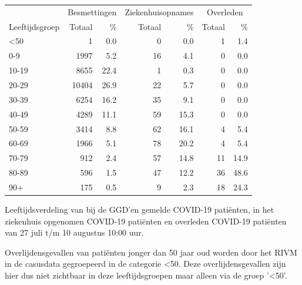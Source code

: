 \documentclass[
  english,
  man,floatsintext]{apa6}
\begin{document}
\begin{table}
\centering\begingroup\fontsize{11}{13}\selectfont

\begin{threeparttable}
\begin{tabular}{lrrrrrr}
\toprule
\multicolumn{1}{c}{ } & \multicolumn{2}{c}{Besmettingen} & \multicolumn{2}{c}{Ziekenhuisopnames} & \multicolumn{2}{c}{Overleden} \\
\cmidrule(l{3pt}r{3pt}){2-3} \cmidrule(l{3pt}r{3pt}){4-5} \cmidrule(l{3pt}r{3pt}){6-7}
Leeftijdsgroep & Totaal & \% & Totaal & \% & Totaal & \%\\
\midrule
<50 & 1 & 0.0 & 0 & 0.0 & 1 & 1.4\\
0-9 & 1997 & 5.2 & 16 & 4.1 & 0 & 0.0\\
10-19 & 8655 & 22.4 & 1 & 0.3 & 0 & 0.0\\
20-29 & 10404 & 26.9 & 22 & 5.7 & 0 & 0.0\\
30-39 & 6254 & 16.2 & 35 & 9.1 & 0 & 0.0\\
40-49 & 4289 & 11.1 & 59 & 15.3 & 0 & 0.0\\
50-59 & 3414 & 8.8 & 62 & 16.1 & 4 & 5.4\\
60-69 & 1966 & 5.1 & 78 & 20.2 & 4 & 5.4\\
70-79 & 912 & 2.4 & 57 & 14.8 & 11 & 14.9\\
80-89 & 596 & 1.5 & 47 & 12.2 & 36 & 48.6\\
90+ & 175 & 0.5 & 9 & 2.3 & 18 & 24.3\\
\bottomrule
\end{tabular}
\begin{tablenotes}
\item[1] Leeftijdsverdeling van bij de GGD’en gemelde COVID-19 patiënten, in het ziekenhuis opgenomen COVID-19 patiënten en overleden COVID-19 patiënten van 27 juli t/m 10 augustus 10:00 uur.
\item[2] Overlijdensgevallen van patiënten jonger dan 50 jaar oud worden door het RIVM in de casusdata gegroepeerd in de categorie <50. Deze overlijdensgevallen zijn hier dus niet zichtbaar in deze leeftijdsgroepen maar alleen via de groep '<50'.
\end{tablenotes}
\end{threeparttable}
\endgroup{}
\end{table}

\newpage
\end{document}

